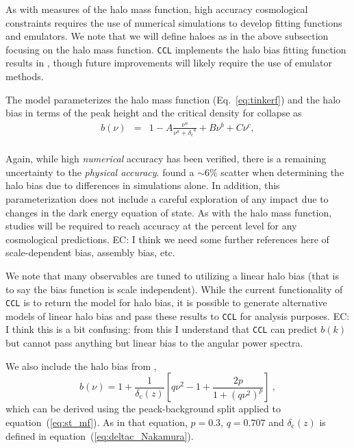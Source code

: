 \documentclass[\docopts]{\docclass}
\newcommand{\elisa}[1]{\textcolor{green!10!orange!90!}{EC: #1}}
\newcommand{\ccl}{{\tt CCL}\xspace}
\begin{document}
As with measures of the halo mass function, high accuracy cosmological constraints requires the use of numerical simulations to develop fitting functions and emulators. We note that we will define haloes as in the above subsection focusing on the halo mass function. {\tt CCL} implements the halo bias fitting function results in \citet{Tinker2010}, though future improvements will likely require the use of emulator methods.

The \citet{Tinker2010} model parameterizes the halo mass function (Eq.~\ref{eq:tinkerf}) and the halo bias in terms of the peak height and the critical density for collapse as
\begin{eqnarray}
  b(\nu) &=& 1 - A\frac{\nu^a}{\nu^a + {\delta_c}^a} + B\nu^b+C\nu^c,\\
\end{eqnarray}

Again, while high {\em numerical} accuracy has been verified, there is a remaining uncertainty to the {\em physical accuracy}. \citet{Tinker2010} found a $\sim6\%$ scatter when determining the halo bias due to differences in simulations alone. In addition, this parameterization does not include a careful exploration of any impact due to changes in the dark energy equation of state. As with the halo mass function, studies will be required to reach accuracy at the percent level for any cosmological predictions. \elisa{I think we need some further references here of scale-dependent bias, assembly bias, etc.}

We note that many observables are tuned to utilizing a linear halo bias (that is to say the bias function is scale independent). While the current functionality of \ccl is to return the \citet{Tinker2010} model for halo bias, it is possible to generate alternative models of linear halo bias and pass these results to \ccl for analysis purposes. \elisa{I think this is a bit confusing: from this I understand that \ccl can predict $b(k)$ but cannot pass anything but linear bias to the angular power spectra.}

We also include the halo bias from \cite{Sheth1999},
\begin{equation}
b(\nu)=1+\frac{1}{\delta_\mathrm{c}(z)}\left[q\nu^2-1+\frac{2p}{1+(q\nu^2)^p}\right]\ ,
\label{eq:st_bias}
\end{equation}
which can be derived using the peack-background split applied to equation~(\ref{eq:st_mf}). As in that equation, $p=0.3$, $q=0.707$ and $\delta_\mathrm{c}(z)$ is defined in equation~(\ref{eq:deltac_Nakamura}).
\end{document}
